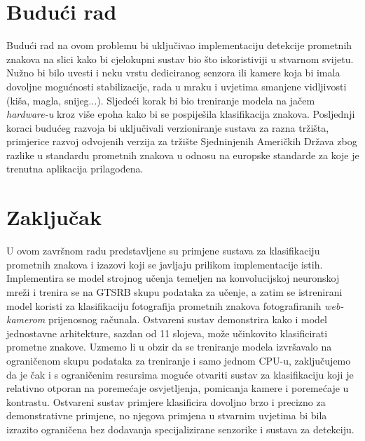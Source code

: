 \documentclass[times, utf8, zavrsni]{fer}
\begin{document}
\chapter{Budući rad}
Budući rad na ovom problemu bi uključivao implementaciju detekcije prometnih znakova na slici kako bi cjelokupni sustav bio što iskoristiviji u stvarnom svijetu. Nužno bi bilo uvesti i neku vrstu dediciranog senzora ili kamere koja bi imala dovoljne mogućnosti stabilizacije, 
rada u mraku i uvjetima smanjene vidljivosti (kiša, magla, snijeg...). Sljedeći korak bi bio treniranje modela na jačem \emph{hardware-u} kroz više epoha kako bi se pospiješila klasifikacija znakova. Posljednji koraci budućeg razvoja bi uključivali verzioniranje sustava za razna tržišta, primjerice
razvoj odvojenih verzija za tržište Sjedninjenih Američkih Država zbog razlike u standardu prometnih znakova u odnosu na europske standarde za koje je trenutna aplikacija prilagođena.

\chapter{Zaključak}
U ovom završnom radu predstavljene su primjene sustava za klasifikaciju prometnih znakova i izazovi koji se javljaju prilikom implementacije istih. Implementira se model strojnog učenja temeljen na konvolucijskoj neuronskoj mreži i trenira se na GTSRB skupu podataka za učenje, 
a zatim se istrenirani model koristi za klasifikaciju fotografija prometnih znakova fotografiranih \emph{web-kamerom} prijenosnog računala. Ostvareni sustav demonstrira kako i model jednostavne arhitekture, sazdan od 11 slojeva, može učinkovito klasificirati prometne znakove.
Uzmemo li u obzir da se treniranje modela izvršavalo na ograničenom skupu podataka za treniranje i samo jednom CPU-u, zaključujemo da je čak i s ograničenim resursima moguće otvariti sustav za klasifikaciju koji je relativno otporan na poremećaje osvjetljenja, pomicanja kamere i poremećaje u kontrastu.
Ostvareni sustav primjere klasificira dovoljno brzo i precizno za demonstrativne primjene, no njegova primjena u stvarnim uvjetima bi bila izrazito ograničena bez dodavanja specijalizirane senzorike i sustava za detekciju. 
\end{document}

